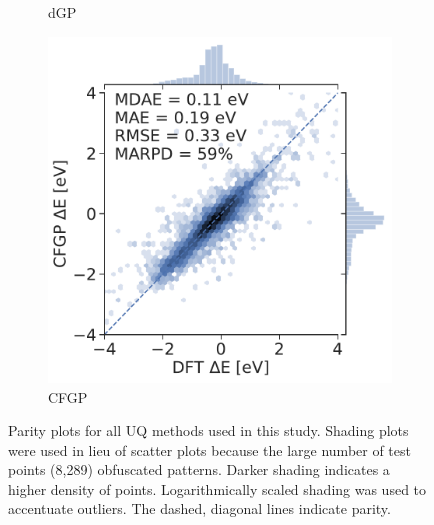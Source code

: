 \documentclass[]{achemso}
\begin{document}
\begin{figure}
\begin{subfigure}{0.32\textwidth}
        \caption{\gls{dGP}}\label{fig:parity_dgp}
    \end{subfigure}
    \begin{subfigure}{0.32\textwidth}
        \includegraphics[width=\textwidth]{../CFGP/Matern/parity.pdf}
        \caption{\gls{CFGP}}\label{fig:parity_cfgp}
    \end{subfigure}
    \caption{Parity plots for all \gls{UQ} methods used in this study.
    Shading plots were used in lieu of scatter plots because the large number of test points (8,289) obfuscated patterns.
    Darker shading indicates a higher density of points.
    Logarithmically scaled shading was used to accentuate outliers.
    The dashed, diagonal lines indicate parity.}\label{fig:parity}
\end{figure}
\end{document}

